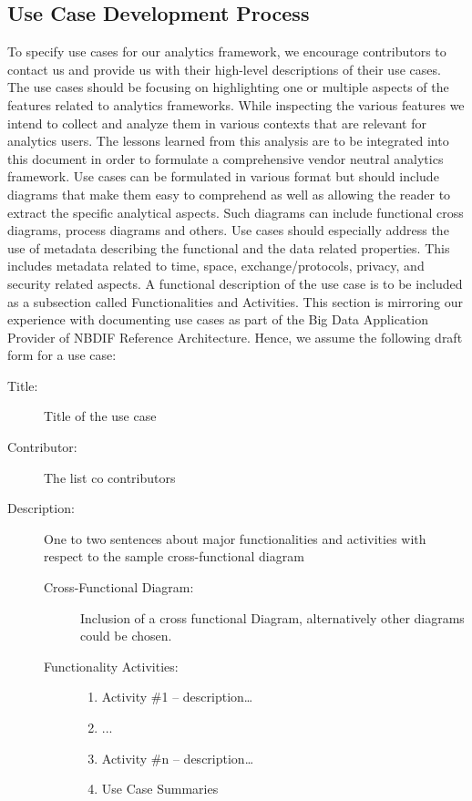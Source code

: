 \documentclass[12pt]{article}
\begin{document}
\subsection{Use Case Development Process}

To specify use cases for our analytics framework, we encourage contributors to contact us and provide us with their high-level descriptions of their use cases. The use cases should be focusing on highlighting one or multiple aspects of the features related to analytics frameworks. While inspecting the various features we intend to collect and analyze them in various contexts that are relevant for analytics users. The lessons learned from this analysis are to be integrated into this document in order to formulate a comprehensive vendor neutral analytics framework.
Use cases can be formulated in various format but should include diagrams that make them easy to comprehend as well as allowing the reader to extract the specific analytical aspects. Such diagrams can include functional cross diagrams, process diagrams and others.
Use cases should especially address the use of metadata describing the functional and the data related properties. This includes metadata related to time, space, exchange/protocols, privacy, and security related aspects.
A functional description of the use case is to be included as a subsection called Functionalities and Activities. This section is mirroring our experience with documenting use cases as part of the Big Data Application Provider of NBDIF Reference Architecture. Hence, we assume the following draft form for a use case:

\begin{description}
\item[Title:] 		Title of the use case
\item[Contributor:] 	The list co contributors
\item[Description:] 	One to two sentences about major functionalities and activities with respect to the sample cross-functional diagram
	
	\begin{description}
	\item[Cross-Functional Diagram:]
		Inclusion of a cross functional Diagram, alternatively other diagrams could be 			chosen.
	\item[Functionality Activities:]
	\begin{enumerate}
        \item Activity \#1 – description…
        \item ...
        \item Activity \#n – description…
    	\item Use Case Summaries
    \end{enumerate}
\end{description}
\end{description}
\end{document}
